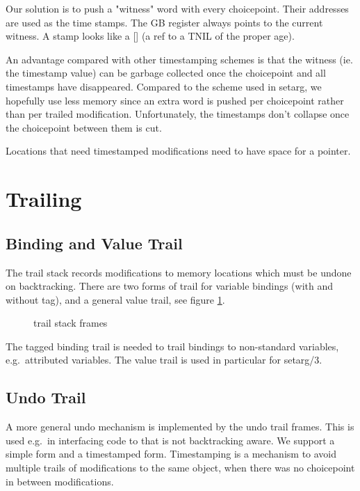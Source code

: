 Our solution is to push a "witness" word with every choicepoint. 
Their addresses are used as the time stamps.
The GB  register always points to the current witness.
A stamp looks like a [] (a ref to a TNIL  of the proper age).

An advantage compared with other timestamping schemes is that the
witness (ie. the timestamp value) can be garbage collected once
the choicepoint and all timestamps have disappeared.
Compared to the scheme used in setarg, we hopefully use less memory
since an extra word is pushed per choicepoint rather than per trailed
modification.
Unfortunately, the timestamps don't collapse once the choicepoint between
them is cut.

Locations that need timestamped modifications need to have space for
a pointer.


\section{Trailing}
\subsection{Binding and Value Trail}
The trail stack records modifications to memory locations which must be
undone on backtracking. There are two forms of trail for variable bindings
(with and without tag), and a general value trail, see figure
\ref{figtrailframes}.
\begin{figure}
\caption{{\eclipse} trail stack frames}
\label{figtrailframes}
\end{figure}
The tagged binding trail is needed to trail bindings to non-standard
variables, e.g.\ attributed variables.
The value trail is used in particular for setarg/3.


\subsection{Undo Trail}
A more general undo mechanism is implemented by the undo trail  frames.
This is used e.g.\ in interfacing  code to {\eclipse} that is not backtracking
aware. We support a simple form and a timestamped form. Timestamping
is a mechanism to avoid multiple trails of modifications to the same
object, when there was no choicepoint in between modifications.

